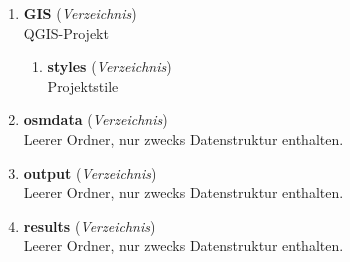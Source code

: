 \begin{enumerate}[label=B\arabic*, ref=B\arabic*, leftmargin=*, itemsep=0.5em, topsep=0.3em]
\begin{enumerate}[label=B\arabic{enumi}-\arabic*, ref=B\arabic{enumi}-\arabic*, leftmargin=*, itemsep=0.5em, topsep=0.3em]
Untersuchungsgebiet mit 10 km Puffer (VG250)\\
\texttt{\small geodata/regbez10kmbuffer.geojson}
\edef\appendixlabelkey{app:B\arabic{enumi}-\arabic{enumii}}
\expandafter\label\expandafter{\appendixlabelkey}
\item \textbf{regbez25kmbuffer.geojson} \textnormal{(\textit{GeoJSON})}\\
Untersuchungsgebiet mit 25 km Puffer (VG250)\\
\texttt{\small geodata/regbez25kmbuffer.geojson}
\edef\appendixlabelkey{app:B\arabic{enumi}-\arabic{enumii}}
\expandafter\label\expandafter{\appendixlabelkey}
\item \textbf{zensus.gpkg} \textnormal{(\textit{GeoPackage})}\\
Zensusgitter (bewohnte Zellen)\\
\texttt{\small geodata/zensus.gpkg}
\edef\appendixlabelkey{app:B\arabic{enumi}-\arabic{enumii}}
\expandafter\label\expandafter{\appendixlabelkey}
\end{enumerate}
\item \textbf{GIS} \textnormal{(\textit{Verzeichnis})}\\
QGIS-Projekt
\edef\appendixlabelkey{app:B\arabic{enumi}}
\expandafter\label\expandafter{\appendixlabelkey}
\begin{enumerate}[label=B\arabic{enumi}-\arabic*, ref=B\arabic{enumi}-\arabic*, leftmargin=*, itemsep=0.5em, topsep=0.3em]
\item \textbf{styles} \textnormal{(\textit{Verzeichnis})}\\
Projektstile
\edef\appendixlabelkey{app:B\arabic{enumi}-\arabic{enumii}}
\expandafter\label\expandafter{\appendixlabelkey}
\end{enumerate}
\item \textbf{osmdata} \textnormal{(\textit{Verzeichnis})}\\
Leerer Ordner, nur zwecks Datenstruktur enthalten.
\edef\appendixlabelkey{app:B\arabic{enumi}}
\expandafter\label\expandafter{\appendixlabelkey}
\item \textbf{output} \textnormal{(\textit{Verzeichnis})}\\
Leerer Ordner, nur zwecks Datenstruktur enthalten.
\edef\appendixlabelkey{app:B\arabic{enumi}}
\expandafter\label\expandafter{\appendixlabelkey}
\item \textbf{results} \textnormal{(\textit{Verzeichnis})}\\
Leerer Ordner, nur zwecks Datenstruktur enthalten.
\edef\appendixlabelkey{app:B\arabic{enumi}}
\expandafter\label\expandafter{\appendixlabelkey}

\end{enumerate}
